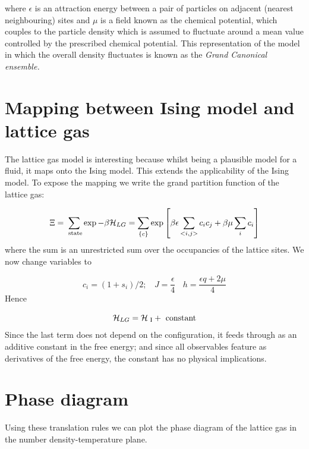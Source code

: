 \documentclass[
  letterpaper,
  enabledeprecatedfontcommands]{report}
\begin{document}
where \(\epsilon\) is an attraction energy between a pair of particles
on adjacent (nearest neighbouring) sites and \(\mu\) is a field known as
the chemical potential, which couples to the particle density which is
assumed to fluctuate around a mean value controlled by the prescribed
chemical potential. This representation of the model in which the
overall density fluctuates is known as the \emph{Grand Canonical
ensemble.}

\section{Mapping between Ising model and lattice
gas}\label{mapping-between-ising-model-and-lattice-gas}

The lattice gas model is interesting because whilst being a plausible
model for a fluid, it maps onto the Ising model. This extends the
applicability of the Ising model. To expose the mapping we write the
grand partition function of the lattice gas:

\[ \Xi=\sum_\textrm{ state}\exp-\beta{\cal H}_{LG}=\sum_{\{c\}}\exp\left[\beta \epsilon\sum_{<i,j>}c_ic_j +\beta\mu\sum_ic_i\right] \]
where the sum is an unrestricted sum over the occupancies of the lattice
sites. We now change variables to

\[c_i=(1+s_i)/2; ~~~~ J=\frac{\epsilon}{4} ~~~~
h=\frac{\epsilon q+2\mu}{4}\] Hence

\[{\cal H}_{LG}={\cal H}_\textrm{ I} + \textrm{ constant}\] Since the
last term does not depend on the configuration, it feeds through as an
additive constant in the free energy; and since all observables feature
as derivatives of the free energy, the constant has no physical
implications.

\section{Phase diagram}\label{phase-diagram-1}

Using these translation rules we can plot the phase diagram of the
lattice gas in the number density-temperature plane.
\end{document}
